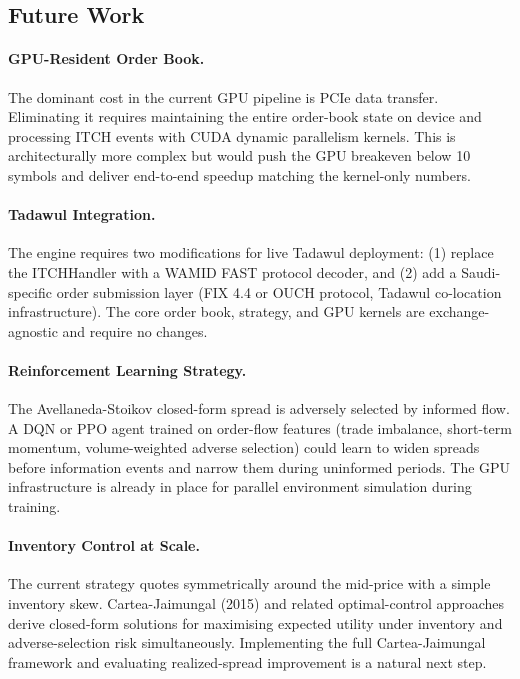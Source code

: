 \documentclass[12pt]{article}
\begin{document}
\subsection{Future Work}
\label{sec:conc:future}

\paragraph{GPU-Resident Order Book.}
The dominant cost in the current GPU pipeline is PCIe data transfer.
Eliminating it requires maintaining the entire order-book state on
device and processing ITCH events with CUDA dynamic parallelism kernels.
This is architecturally more complex but would push the GPU breakeven
below 10 symbols and deliver end-to-end speedup matching the
kernel-only numbers.

\paragraph{Tadawul Integration.}
The engine requires two modifications for live Tadawul deployment:
(1) replace the ITCHHandler with a WAMID FAST protocol decoder, and
(2) add a Saudi-specific order submission layer (FIX 4.4 or OUCH
protocol, Tadawul co-location infrastructure). The core order book,
strategy, and GPU kernels are exchange-agnostic and require no changes.

\paragraph{Reinforcement Learning Strategy.}
The Avellaneda-Stoikov closed-form spread is adversely selected by
informed flow. A DQN or PPO agent trained on order-flow features
(trade imbalance, short-term momentum, volume-weighted adverse
selection) could learn to widen spreads before information events
and narrow them during uninformed periods. The GPU infrastructure
is already in place for parallel environment simulation during
training.

\paragraph{Inventory Control at Scale.}
The current strategy quotes symmetrically around the mid-price with
a simple inventory skew. Cartea-Jaimungal (2015) \cite{cartea2015}
and related optimal-control approaches derive closed-form solutions
for maximising expected utility under inventory and adverse-selection
risk simultaneously. Implementing the full Cartea-Jaimungal framework
and evaluating realized-spread improvement is a natural next step.
\end{document}
